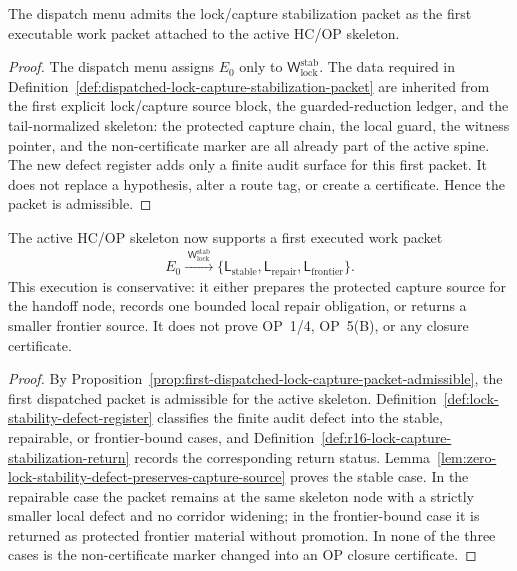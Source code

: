 \begin{proposition}
\label{prop:first-dispatched-lock-capture-packet-admissible}
The dispatch menu admits the lock/capture stabilization packet as the first executable work packet attached to the active HC/OP skeleton.
\end{proposition}

\begin{proof}
The dispatch menu assigns \(E_0\) only to \(\mathsf W_{\mathrm{lock}}^{\mathrm{stab}}\). The data required in Definition~\ref{def:dispatched-lock-capture-stabilization-packet} are inherited from the first explicit lock/capture source block, the guarded-reduction ledger, and the tail-normalized skeleton: the protected capture chain, the local guard, the witness pointer, and the non-certificate marker are all already part of the active spine. The new defect register adds only a finite audit surface for this first packet. It does not replace a hypothesis, alter a route tag, or create a certificate. Hence the packet is admissible.
\end{proof}

\begin{theorem}
\label{thm:first-dispatched-lock-capture-stabilization-packet}
The active HC/OP skeleton now supports a first executed work packet
\[
 E_0
 \xrightarrow{\;\mathsf W_{\mathrm{lock}}^{\mathrm{stab}}\;}
 \{\mathsf L_{\mathrm{stable}},\mathsf L_{\mathrm{repair}},\mathsf L_{\mathrm{frontier}}\}.
\]
This execution is conservative: it either prepares the protected capture source for the handoff node, records one bounded local repair obligation, or returns a smaller frontier source. It does not prove OP~1/4, OP~5(B), or any closure certificate.
\end{theorem}

\begin{proof}
By Proposition~\ref{prop:first-dispatched-lock-capture-packet-admissible}, the first dispatched packet is admissible for the active skeleton. Definition~\ref{def:lock-stability-defect-register} classifies the finite audit defect into the stable, repairable, or frontier-bound cases, and Definition~\ref{def:r16-lock-capture-stabilization-return} records the corresponding return status. Lemma~\ref{lem:zero-lock-stability-defect-preserves-capture-source} proves the stable case. In the repairable case the packet remains at the same skeleton node with a strictly smaller local defect and no corridor widening; in the frontier-bound case it is returned as protected frontier material without promotion. In none of the three cases is the non-certificate marker changed into an OP closure certificate.
\end{proof}


